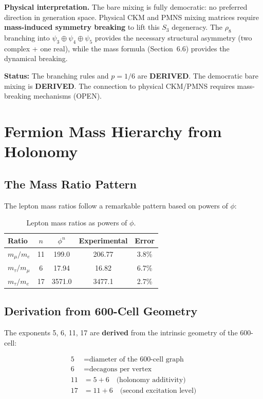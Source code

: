 \documentclass[12pt,a4paper]{article}
\begin{document}
\textbf{Physical interpretation.} The bare mixing is fully democratic: no preferred direction in generation space. Physical CKM and PMNS mixing matrices require \textbf{mass-induced symmetry breaking} to lift this $S_3$ degeneracy. The $\rho_8$ branching into $\psi_3 \oplus \psi_4 \oplus \psi_5$ provides the necessary structural asymmetry (two complex + one real), while the mass formula (Section~6.6) provides the dynamical breaking.

\textbf{Status:} The branching rules and $p = 1/6$ are \textbf{DERIVED}. The democratic bare mixing is \textbf{DERIVED}. The connection to physical CKM/PMNS requires mass-breaking mechanisms (OPEN).

\section{Fermion Mass Hierarchy from Holonomy}

\subsection{The Mass Ratio Pattern}

The lepton mass ratios follow a remarkable pattern based on powers of $\phi$:

\begin{table}[H]
\centering
\begin{tabular}{lcccc}
\toprule
\textbf{Ratio} & \textbf{$n$} & \textbf{$\phi^n$} & \textbf{Experimental} & \textbf{Error} \\
\midrule
$m_\mu/m_e$ & 11 & 199.0 & 206.77 & 3.8\% \\
$m_\tau/m_\mu$ & 6 & 17.94 & 16.82 & 6.7\% \\
$m_\tau/m_e$ & 17 & 3571.0 & 3477.1 & 2.7\% \\
\bottomrule
\end{tabular}
\caption{Lepton mass ratios as powers of $\phi$.}
\end{table}

\subsection{Derivation from 600-Cell Geometry}

The exponents 5, 6, 11, 17 are \textbf{derived} from the intrinsic geometry of the 600-cell:

\begin{equation}
\boxed{
\begin{aligned}
5 &= \text{diameter of the 600-cell graph} \\
6 &= \text{decagons per vertex} \\
11 &= 5 + 6 \quad \text{(holonomy additivity)} \\
17 &= 11 + 6 \quad \text{(second excitation level)}
\end{aligned}
}
\end{equation}
\end{document}
